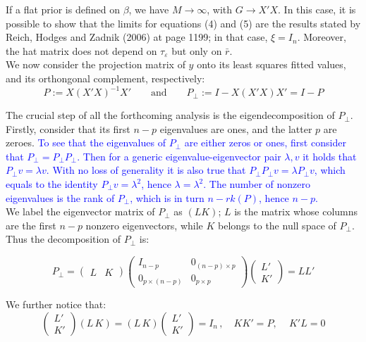 \documentclass{article}
\begin{document}
 If a flat prior is defined on $\beta$, we have $M \longrightarrow \infty$, with $G \longrightarrow X'X$. In this case, it is possible to show that the limits for equations (4) and (5) are the results stated by Reich, Hodges and Zadnik (2006) at page 1199; in that case, $\xi = I_n$. Moreover, the hat matrix does not depend on $\tau_{\varepsilon}$ but only on $\bar{r}$.\\


We now consider the projection matrix of $y$ onto its least squares fitted values, and its orthongonal complement, respectively:
$$
P := X(X'X)^{-1}X' \quad \quad \text{and} \quad \quad P_{\bot} := I - X(X'X)X' = I - P
$$

The crucial step of all the forthcoming analysis is the eigendecomposition of $P_{\bot}$. Firstly, consider that its first $n-p$ eigenvalues are ones, and the latter $p$ are zeroes. \textcolor{blue}{To see that the eigenvalues of $P_{\bot}$ are either zeros or ones, first consider that $P_{\bot} = P_{\bot} P_{\bot}$. Then for a generic eigenvalue-eigenvector pair $\lambda, v$ it holds that $P_{\bot} v = \lambda v$. With no loss of generality it is also true that $P_{\bot} P_{\bot} v = \lambda P_{\bot} v$, which equals to the identity $P_{\bot} v = \lambda^2 $, hence $\lambda = \lambda^2$. The number of nonzero eigenvalues is the rank of $P_{\bot}$, which is in turn $n - rk(P)$, hence $n-p$.}\\
We label the eigenvector matrix of $P_{\bot}$ as $(L K)$; $L$ is the matrix whose columns are the first $n-p$ nonzero eigenvectors, while $K$ belongs to the null space of $P_{\bot}$. Thus the decomposition of $P_{\bot}$ is:

$$
P_{\bot} =  \begin{pmatrix}L & K \end{pmatrix} 
\begin{pmatrix} I_{n-p} & 0_{(n-p) \times p } \\ 0_{p \times (n-p)} & 0_{p \times p} \end{pmatrix}
 \begin{pmatrix} L' \\ K' \end{pmatrix} = L L'
$$

We further notice that:
$$
\begin{pmatrix} L' \\ K'\end{pmatrix} (L \, K) = (L \, K) \begin{pmatrix} L' \\ K'\end{pmatrix} = I_n \, , \quad KK' = P, \, \quad K'L = 0 
$$
\end{document}
